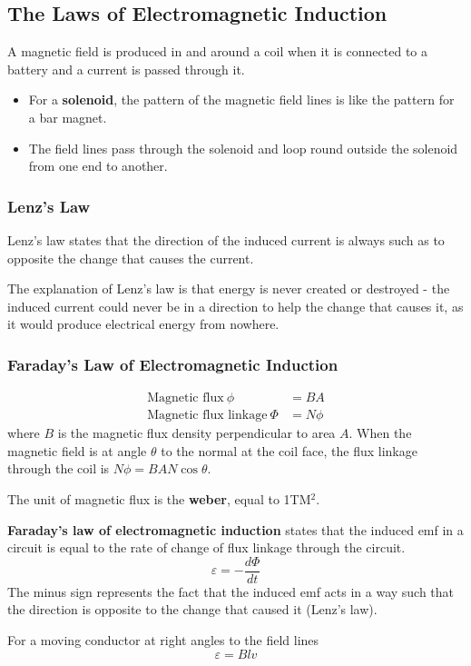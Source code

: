 \subsection{The Laws of Electromagnetic Induction}

A magnetic field is produced in and around a coil when it is connected to a battery and a current is passed through it.

\begin{itemize}
    \item For a \textbf{solenoid}, the pattern of the magnetic field lines is like the pattern for a bar magnet.
    \item The field lines pass through the solenoid and loop round outside the solenoid from one end to another.
\end{itemize}

\subsubsection*{Lenz's Law}

Lenz's law states that the direction of the induced current is always such as to opposite the change that causes the current.

The explanation of Lenz's law is that energy is never created or destroyed - the induced current could never be in a direction to help the change that causes it, as it would produce electrical energy from nowhere.

\subsubsection*{Faraday's Law of Electromagnetic Induction}

\begin{align*}
    \text{Magnetic flux}\ \phi&=BA\\
    \text{Magnetic flux linkage}\ \Phi&=N\phi
\end{align*}
where $B$ is the magnetic flux density perpendicular to area $A$. When the magnetic field is at angle $\theta$ to the normal at the coil face, the flux linkage through the coil is $N\phi=BAN\cos\theta$.

The unit of magnetic flux is the \textbf{weber}, equal to 1TM$^2$.

\textbf{Faraday's law of electromagnetic induction} states that the induced emf in a circuit is equal to the rate of change of flux linkage through the circuit.
$$\varepsilon=-\frac{d\Phi}{dt}$$
The minus sign represents the fact that the induced emf acts in a way such that the direction is opposite to the change that caused it (Lenz's law).

For a moving conductor at right angles to the field lines
$$\varepsilon=Blv$$
